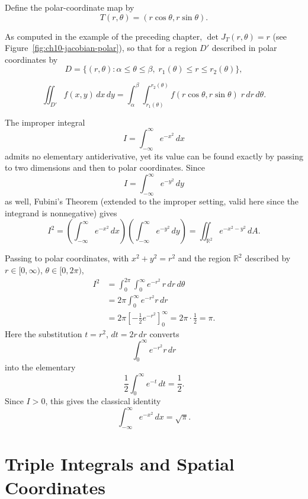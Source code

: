\begin{corollary}
Define the polar-coordinate map by
\[
T(r,\theta) = (r\cos\theta, r\sin\theta).
\]

As computed in the example of the preceding chapter, $\det J_T(r,\theta) = r$ (see Figure~\ref{fig:ch10-jacobian-polar}), so that for a region $D'$ described in polar coordinates by
\[
D = \{(r,\theta) : \alpha \leq \theta \leq \beta, \; r_1(\theta) \leq r \leq r_2(\theta)\},
\]

\[
\iint_{D'} f(x,y)\, dx\, dy = \int_{\alpha}^{\beta} \int_{r_1(\theta)}^{r_2(\theta)} f(r\cos\theta, r\sin\theta)\; r\, dr\, d\theta.
\]

\end{corollary}

\begin{example}
The improper integral
\[
I = \int_{-\infty}^{\infty} e^{-x^2}\, dx
\]
admits no elementary antiderivative, yet its value can be found exactly by passing to two dimensions and then to polar coordinates. Since
\[
I = \int_{-\infty}^\infty e^{-y^2}\,dy
\]
as well, Fubini's Theorem (extended to the improper setting, valid here since the integrand is nonnegative) gives
\[
I^2 = \left(\int_{-\infty}^{\infty} e^{-x^2}\, dx\right)\left(\int_{-\infty}^{\infty} e^{-y^2}\, dy\right) = \iint_{\mathbb{R}^2} e^{-x^2-y^2}\, dA.
\]

Passing to polar coordinates, with $x^2+y^2 = r^2$ and the region $\mathbb{R}^2$ described by $r \in [0,\infty)$, $\theta \in [0,2\pi)$,
\[
\begin{aligned}
I^2 &= \int_0^{2\pi}\int_0^{\infty} e^{-r^2}\, r\, dr\, d\theta \\
&= 2\pi \int_0^{\infty} e^{-r^2} r\, dr \\
&= 2\pi \left[ -\frac{1}{2} e^{-r^2} \right]_0^{\infty}
= 2\pi \cdot \frac{1}{2} = \pi.
\end{aligned}
\]
Here the substitution $t=r^2$, $dt = 2r\,dr$ converts \[
\int_0^\infty e^{-r^2}r\,dr
\] into the elementary
\[
\frac12\int_0^\infty e^{-t}\,dt = \frac12.
\]
Since $I > 0$, this gives the classical identity
\[
\int_{-\infty}^{\infty} e^{-x^2}\, dx = \sqrt{\pi}.
\]

\end{example}

\section{Triple Integrals and Spatial Coordinates}

